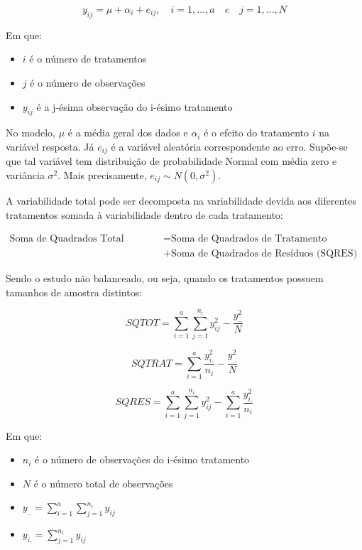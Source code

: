 \documentclass[
  portuguese,
]{estat/estat}
\begin{document}
\[
y_{ij} = \mu + \alpha_i + e_{ij}, \quad i=1,…,a \quad e \quad j=1,…,N
\]

Em que:

\begin{itemize}
\item
  \(i\) é o número de tratamentos
\item
  \(j\) é o número de observações
\item
  \(y_{ij}\) é a j-ésima observação do i-ésimo tratamento
\end{itemize}

No modelo, \(\mu\) é a média geral dos dados e \(\alpha_i\) é o efeito
do tratamento \(i\) na variável resposta. Já \(e_{ij}\) é a variável
aleatória correspondente ao erro. Supõe-se que tal variável tem
distribuição de probabilidade Normal com média zero e variância
\(\sigma^2\). Mais precisamente, \(e_{ij} \sim N(0,\sigma^2)\).

A variabilidade total pode ser decomposta na variabilidade devida aos
diferentes tratamentos somada à variabilidade dentro de cada tratamento:

\begin{align*}
\text{Soma de Quadrados Total (SQTOT)} &= \text{Soma de Quadrados de Tratamento (SQTRAT)} \\
&+ \text{Soma de Quadrados de Resíduos (SQRES)}
\end{align*}

Sendo o estudo não balanceado, ou seja, quando os tratamentos possuem
tamanhos de amostra distintos:

\[
SQTOT = \sum\limits_{i=1}^a \sum\limits_{j=1}^{n_i} y_{ij}^2 - \frac{y_{..}^2}{N}
\]

\[
SQTRAT = \sum\limits_{i=1}^a \frac{y_{i.}^2}{n_i} - \frac{y_{..}^2}{N}
\]

\[
SQRES = \sum\limits_{i=1}^a \sum\limits_{j=1}^{n_i} y_{ij}^2 - \sum\limits_{i=1}^a \frac{y_{i.}^2}{n_i}
\]

Em que:

\begin{itemize}
\item
  \(n_i\) é o número de observações do i-ésimo tratamento
\item
  \(N\) é o número total de observações
\item
  \(y_{..} = \sum\limits_{i=1}^a \sum\limits_{j=1}^{n_i} y_{ij}\)
\item
  \(y_{i.} = \sum\limits_{j=1}^{n_i} y_{ij}\)
\end{itemize}
\end{document}
